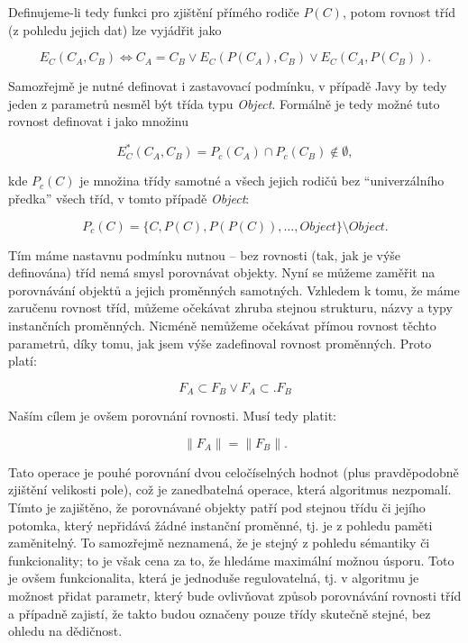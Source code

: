 Definujeme-li tedy funkci pro zjištění přímého rodiče $P(C)$, potom rovnost tříd (z pohledu jejich dat) lze vyjádřit jako

\begin{equation}
    E_C(C_A, C_B) \Leftrightarrow C_A = C_B \vee E_C(P(C_A), C_B) \vee E_C(C_A, P(C_B)).   
\end{equation}

Samozřejmě je nutné definovat i zastavovací podmínku, v případě Javy by tedy jeden z parametrů nesměl být třída typu \textit{Object}. Formálně je tedy možné tuto rovnost definovat i jako množinu

\begin{equation}
E_C^{*}(C_A, C_B)= P_c(C_A) \cap P_c(C_B) \notin \emptyset,
\end{equation}

kde $P_c(C)$ je množina třídy samotné a všech jejich rodičů bez “univerzálního předka” všech tříd, v tomto případě \textit{Object}:

\begin{equation}
P_c(C) = \{C, P(C), P(P(C)), \dots, Object\} \setminus Object.
\end{equation}

Tím máme nastavnu podmínku nutnou -- bez rovnosti (tak, jak je výše definována) tříd nemá smysl porovnávat objekty. Nyní se můžeme zaměřit na porovnávání objektů a jejich proměnných samotných. Vzhledem k tomu, že máme zaručenu rovnost tříd, můžeme očekávat zhruba stejnou strukturu, názvy a typy instančních proměnných. Nicméně nemůžeme očekávat přímou rovnost těchto parametrů, díky tomu, jak jsem výše zadefinoval rovnost proměnných. Proto platí:

\begin{equation}
F_A \subset F_B \vee F_A \subset. F_B 
\end{equation}

Naším cílem je ovšem porovnání rovnosti. Musí tedy platit:

\begin{equation}
\|F_A\| = \|F_B\|.
\end{equation}

Tato operace je pouhé porovnání dvou celočíselných hodnot (plus pravděpodobně zjištění velikosti pole), což je zanedbatelná operace, která algoritmus nezpomalí. Tímto je zajištěno, že porovnávané objekty patří pod stejnou třídu či jejího potomka, který nepřidává žádné instanční proměnné, tj. je z pohledu paměti zaměnitelný. To samozřejmě neznamená, že je stejný z pohledu sémantiky či funkcionality; to je však cena za to, že hledáme maximální možnou úsporu. Toto je ovšem funkcionalita, která je jednoduše regulovatelná, tj. v algoritmu je možnost přidat parametr, který bude ovlivňovat způsob porovnávání rovnosti tříd a případně zajistí, že takto budou označeny pouze třídy skutečně stejné, bez ohledu na dědičnost.

